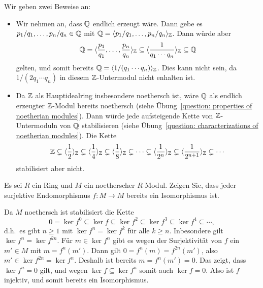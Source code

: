 \begin{solution}
  Wir geben zwei Beweise an:
  \begin{itemize}
    \item
      Wir nehmen an, dass $\mathbb{Q}$ endlich erzeugt wäre.
      Dann gebe es $p_1/q_1, \dotsc, p_n/q_n \in \mathbb{Q}$ mit $\mathbb{Q} = \langle p_1/q_1, \dotsc, p_n/q_n\rangle_{\mathbb{Z}}$.
      Dann würde aber
      \[
                  \mathbb{Q}
        =         \langle \frac{p_1}{q_1}, \dotsc, \frac{p_n}{q_n} \rangle_{\mathbb{Z}}
        \subseteq \langle\frac{1}{q_1 \dotsm q_n}\rangle_{\mathbb{Z}}
        \subseteq \mathbb{Q}
      \]
      gelten, und somit bereits $\mathbb{Q} = \langle1/(q_1 \dotsm q_n)\rangle_{\mathbb{Z}}$.
      Dies kann nicht sein, da $1/(2 q_1 \dotsm q_n)$ in diesem $\mathbb{Z}$-Untermodul nicht enhalten ist.
      
    \item
      Da $\mathbb{Z}$ als Hauptidealring insbesondere noethersch ist, wäre $\mathbb{Q}$ als endlich erzeugter $\mathbb{Z}$-Modul bereits noethersch (siehe Übung~\ref{question: properties of noetherian modules}).
      Dann würde jede aufsteigende Kette von $\mathbb{Z}$-Untermoduln von $\mathbb{Q}$ stabilisieren (siehe Übung~\ref{question: characterizations of noetherian modules}).
      Die Kette
      \[
                    \mathbb{Z}
        \subsetneq  \langle\frac{1}{2}\rangle_{\mathbb{Z}}
        \subsetneq  \langle\frac{1}{4}\rangle_{\mathbb{Z}}
        \subsetneq  \langle\frac{1}{8}\rangle_{\mathbb{Z}}
        \subsetneq  \dotsb
        \subsetneq  \langle\frac{1}{2^n}\rangle_{\mathbb{Z}}
        \subsetneq  \langle\frac{1}{2^{n+1}}\rangle_{\mathbb{Z}}
        \subsetneq  \dotsb
      \]
      stabilisiert aber nicht.
  \end{itemize}
\end{solution}


\begin{question}[subtitle = Surjektive Endomorphismen noetherscher Moduln]
  \label{question: surjective endomorphisms of noetherian modules are isomorphisms}
  Es sei $R$ ein Ring und $M$ ein noetherscher $R$-Modul.
  Zeigen Sie, dass jeder surjektive Endomorphismus $f \colon M \to M$ bereits ein Isomorphismus ist.
\end{question}


\begin{solution}
  Da $M$ noethersch ist stabilisiert die Kette
  \[
              0
    =         \ker f^0
    \subseteq \ker f
    \subseteq \ker f^2
    \subseteq \ker f^3
    \subseteq \ker f^4
    \subseteq \dotsb,
  \]
  d.h.\ es gibt $n \geq 1$ mit $\ker f^n = \ker f^k$ für alle $k \geq n$.
  Inbesondere gilt $\ker f^n = \ker f^{2n}$.
  Für $m \in \ker f^n$ gibt es wegen der Surjektivität von $f$ ein $m' \in M$ mit $m = f^n(m')$.
  Dann gilt $0 = f^n(m) = f^{2n}(m')$, also $m' \in \ker f^{2n} = \ker f^n$.
  Deshalb ist bereits $m = f^n(m') = 0$.
  Das zeigt, dass $\ker f^n = 0$ gilt, und wegen $\ker f \subseteq \ker f^n$ somit auch $\ker f = 0$.
  Also ist $f$ injektiv, und somit bereits ein Isomorphismus.
\end{solution}


